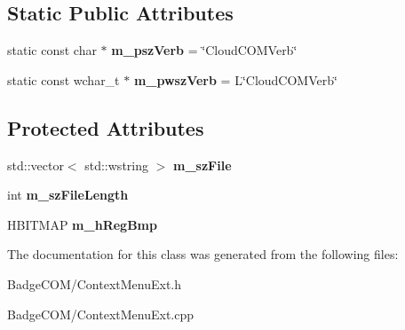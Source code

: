 \subsection*{Static Public Attributes}
\begin{DoxyCompactItemize}
\item 
\hypertarget{class_c_context_menu_ext_a7cc7ef00fe5c21a47ef22a0daf8d228e}{static const char $\ast$ {\bfseries m\-\_\-psz\-Verb} = \char`\"{}Cloud\-C\-O\-M\-Verb\char`\"{}}\label{class_c_context_menu_ext_a7cc7ef00fe5c21a47ef22a0daf8d228e}

\item 
\hypertarget{class_c_context_menu_ext_af1c3e2f8c1056ee96b44931f01dd9c9a}{static const wchar\-\_\-t $\ast$ {\bfseries m\-\_\-pwsz\-Verb} = L\char`\"{}Cloud\-C\-O\-M\-Verb\char`\"{}}\label{class_c_context_menu_ext_af1c3e2f8c1056ee96b44931f01dd9c9a}

\end{DoxyCompactItemize}
\subsection*{Protected Attributes}
\begin{DoxyCompactItemize}
\item 
\hypertarget{class_c_context_menu_ext_a8cfad50beadc0f4b9eed477a5c29fd4b}{std\-::vector$<$ std\-::wstring $>$ {\bfseries m\-\_\-sz\-File}}\label{class_c_context_menu_ext_a8cfad50beadc0f4b9eed477a5c29fd4b}

\item 
\hypertarget{class_c_context_menu_ext_a4ef845db19e61818e5d03085c27adb5f}{int {\bfseries m\-\_\-sz\-File\-Length}}\label{class_c_context_menu_ext_a4ef845db19e61818e5d03085c27adb5f}

\item 
\hypertarget{class_c_context_menu_ext_a4626a0ffc7114d8321da8da78be884e7}{H\-B\-I\-T\-M\-A\-P {\bfseries m\-\_\-h\-Reg\-Bmp}}\label{class_c_context_menu_ext_a4626a0ffc7114d8321da8da78be884e7}

\end{DoxyCompactItemize}


The documentation for this class was generated from the following files\-:\begin{DoxyCompactItemize}
\item 
Badge\-C\-O\-M/Context\-Menu\-Ext.\-h\item 
Badge\-C\-O\-M/Context\-Menu\-Ext.\-cpp\end{DoxyCompactItemize}

